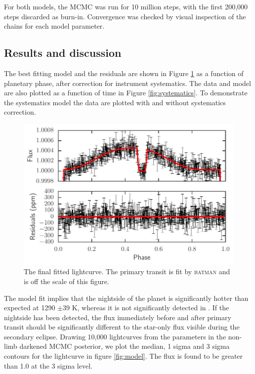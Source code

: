 \documentclass[a4paper,fleqn,usenatbib]{mnras}
\begin{document}
For both models, the MCMC was run for 10 million steps, with the first 200,000 steps discarded as burn-in. Convergence was checked by visual inspection of the chains for each model parameter.

\subsection{Results and discussion}\label{sec:results}

The best fitting model and the residuals are shown in Figure \ref{fig:phase folded} as a function of planetary phase, after correction for instrument systematics. The data and model are also plotted as a function of time in Figure \ref{fig:systematics}. To demonstrate the systematics model the data are plotted with and without systematics correction.

\begin{figure}
\begin{center}
\includegraphics[width=\columnwidth]{img/new_lc.pdf}
\caption{The final fitted lightcurve. The primary transit is fit by \textsc{batman} and is off the scale of this figure.}
\label{fig:phase folded}
\end{center}
\end{figure}

The model fit implies that the nightside of the planet is significantly hotter than expected at 1290 $\pm 39$ K, whereas it is not significantly detected in \citet{Stevenson2014}. If the nightside has been detected, the flux immediately before and after primary transit should be significantly different to the star-only flux visible during the secondary eclipse. Drawing 10,000 lightcurves from the parameters in the non-limb darkened MCMC posterior, we plot the median, 1 sigma and 3 sigma contours for the lightcurve in figure \ref{fig:model}. The flux is found to be greater than 1.0 at the 3 sigma level.
\end{document}
